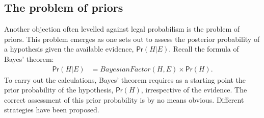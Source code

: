 \documentclass{article}
\newcommand{\pr}{\mathsf{Pr}}
\begin{document}




























\subsection{The problem of priors}
\label{subsec:prior}


Another  objection often levelled against legal probabilism is 
the problem of priors.
This problem emerges as one sets out to assess the posterior probability of a hypothesis given the available evidence, $\pr(H \vert E)$. Recall the formula of Bayes' theorem:  %
\begin{align*} \pr(H \vert E) & =\textit{BayesianFactor}(H, E) \times \pr(H).\end{align*}
%
To carry out the calculations, Bayes' theorem requires  as a starting point the prior probability of the hypothesis, $\pr(H)$, irrespective of the evidence. The correct assessment of this prior probability is by no means obvious. 
Different strategies have been proposed. 
\end{document}
